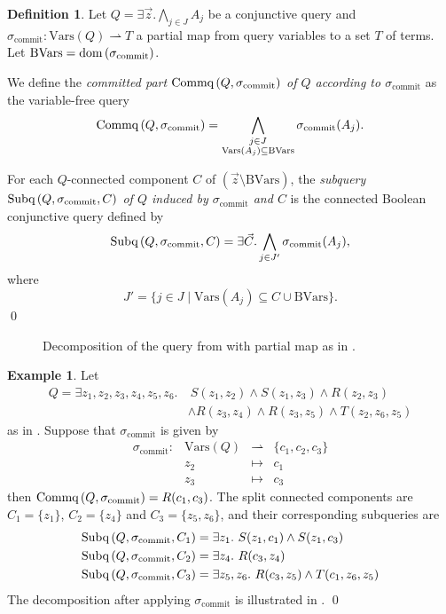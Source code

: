 \documentclass[12pt]{report}
\theoremstyle{plain}
\theoremstyle{definition}
\newtheorem{definition}[theorem]{Definition}
\newtheorem{example}[theorem]{Example}
\def\Vars{{\mathrm{Vars}}}
\newcommand{\dom}[1]{\ensuremath{\normalfont{\operatorname{dom}} \left( #1 \right)}}
\newcommand{\Subq}[3]{\ensuremath{\normalfont{\textrm{Subq}} \left( #1, #2, #3 \right)}}
\newcommand{\Commq}[2]{\ensuremath{\normalfont{\textrm{Commq}} \left( #1, #2 \right)}}
\begin{document}
\begin{definition}
  Let $Q = \exists \vec{z}. \bigwedge_{j \in J} A_j$ be a conjunctive query and $\sigma_\mathrm{commit}: \Vars(Q) \rightharpoonup T$ a partial map from query variables to a set $T$ of terms. Let $\mathrm{BVars} = \dom{\sigma_\mathrm{commit}}$.

  We define the \emph{committed part $\Commq{Q}{\sigma_\mathrm{commit}}$ of $Q$ according to $\sigma_\mathrm{commit}$} as the variable-free query
  $$\Commq{Q}{\sigma_\mathrm{commit}} = \bigwedge_{\substack{j \in J \\ \Vars(A_j) \subseteq \mathrm{BVars}}} \sigma_\mathrm{commit}(A_j).$$

  For each $Q$-connected component $C$ of $(\vec{z} \setminus \mathrm{BVars})$, the \emph{subquery $\Subq{Q}{\sigma_\mathrm{commit}}{C}$ of $Q$ induced by $\sigma_\mathrm{commit}$ and $C$} is the connected Boolean conjunctive query defined by
  $$\Subq{Q}{\sigma_\mathrm{commit}}{C} = \exists \vec{C}. \bigwedge_{j \in J'} \sigma_\mathrm{commit}(A_j),$$
  where $$J' = \{ j \in J \mid \Vars(A_j) \subseteq C \cup \mathrm{BVars} \}.$$
  \qed
\end{definition}

\begin{figure}[ht]
  \centering
  
  \caption{Decomposition of the query from  with partial map as in .}
  \label{bcq-decomposition-example-figure}
\end{figure}

\begin{example}
\label{bcq-decomposition-example}
  Let
  \begin{align*}
    Q = \exists z_1,z_2,z_3,z_4,z_5,z_6.&\ S(z_1, z_2) \wedge S(z_1,z_3) \wedge R(z_2, z_3) \\
    &\wedge R(z_3, z_4) \wedge R(z_3, z_5) \wedge T(z_2, z_6, z_5)
  \end{align*}
  as in . Suppose that $\sigma_\mathrm{commit}$ is given by \[\begin{array}{cccc}
    \sigma_\mathrm{commit}: &\Vars(Q) &\rightharpoonup &\{c_1, c_2, c_3\} \\
    &z_2 &\mapsto &c_1 \\
    &z_3 &\mapsto &c_3
  \end{array}\]
  then $\Commq{Q}{\sigma_\mathrm{commit}} = R(c_1, c_3)$. The split connected components are $C_1 = \{z_1\}$, $C_2 = \{z_4\}$ and $C_3 = \{z_5, z_6\}$, and their corresponding subqueries are
  \begin{align*}
    \Subq{Q}{\sigma_\mathrm{commit}}{C_1} &= \exists z_1.\ S(z_1, c_1) \wedge S(z_1, c_3) \\
    \Subq{Q}{\sigma_\mathrm{commit}}{C_2} &= \exists z_4.\ R(c_3, z_4) \\
    \Subq{Q}{\sigma_\mathrm{commit}}{C_3} &= \exists z_5, z_6.\ R(c_3, z_5) \wedge T(c_1, z_6, z_5)
  \end{align*}
  The decomposition after applying $\sigma_\mathrm{commit}$ is illustrated in .
  \qed
\end{example}
\end{document}
